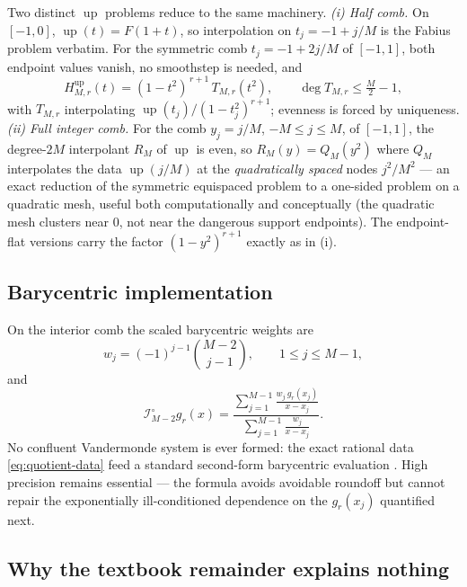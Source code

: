 \documentclass[11pt,oneside]{article}
\numberwithin{equation}{section}
\theoremstyle{definition}
\theoremstyle{remark}
\newcommand{\Up}{\operatorname{up}}
\newcommand{\Lag}{\mathcal I}
\begin{document}
\begin{remark}
\label{rem:up-versions}
Two distinct $\Up$ problems reduce to the same machinery.
\emph{(i) Half comb.}  On $[-1,0]$, $\Up(t)=F(1+t)$, so
interpolation on $t_j=-1+j/M$ is the Fabius problem verbatim.  For
the symmetric comb $t_j=-1+2j/M$ of $[-1,1]$, both endpoint values
vanish, no smoothstep is needed, and
\begin{equation}
 H^{\Up}_{M,r}(t)=(1-t^{2})^{\,r+1}\,T_{M,r}(t^{2}),
 \qquad
 \deg T_{M,r}\le \tfrac M2-1,
 \label{eq:up-factor}
\end{equation}
with $T_{M,r}$ interpolating
$\Up(t_j)/(1-t_j^{2})^{r+1}$; evenness is forced by uniqueness.
\emph{(ii) Full integer comb.}  For the comb $y_j=j/M$,
$-M\le j\le M$, of $[-1,1]$, the degree-$2M$ interpolant $R_M$ of
$\Up$ is even, so $R_M(y)=Q_M(y^{2})$ where $Q_M$ interpolates the
data $\Up(j/M)$ at the \emph{quadratically spaced} nodes
$j^{2}/M^{2}$ --- an exact reduction of the symmetric equispaced
problem to a one-sided problem on a quadratic mesh, useful both
computationally and conceptually (the quadratic mesh clusters near
$0$, not near the dangerous support endpoints).  The endpoint-flat
versions carry the factor $(1-y^{2})^{r+1}$ exactly as in (i).
\end{remark}

\subsection{Barycentric implementation}

On the interior comb the scaled barycentric weights are
\begin{equation}
 w_j=(-1)^{j-1}\binom{M-2}{j-1},
 \qquad 1\le j\le M-1,
 \label{eq:interior-weights}
\end{equation}
and
\begin{equation}
 \Lag^{\circ}_{M-2}g_r(x)
 =\frac{\displaystyle\sum_{j=1}^{M-1}\frac{w_j\,g_r(x_j)}{x-x_j}}
 {\displaystyle\sum_{j=1}^{M-1}\frac{w_j}{x-x_j}}.
 \label{eq:bary-interior}
\end{equation}
No confluent Vandermonde system is ever formed: the exact rational
data \eqref{eq:quotient-data} feed a standard second-form barycentric
evaluation \cite{BerrutTrefethen2004}.  High precision remains
essential --- the formula avoids avoidable roundoff but cannot repair
the exponentially ill-conditioned dependence on the $g_r(x_j)$
quantified next.

\subsection{Why the textbook remainder explains nothing}
\end{document}
